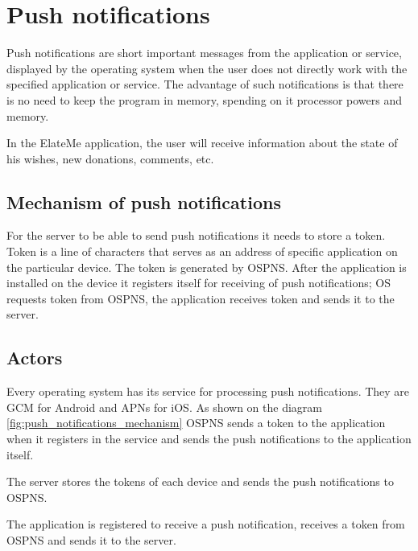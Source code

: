 \section{Push notifications}
Push notifications are short important messages from the application or service, displayed by the operating system when the user does not directly work with the specified application or service. The advantage of such notifications is that there is no need to keep the program in memory, spending on it processor powers and memory.

In the ElateMe application, the user will receive information about the state of his wishes, new donations, comments, etc.

\subsection{Mechanism of push notifications}


For the server to be able to send push notifications it needs to store a token. Token is a line of characters that serves as an address of specific application on the particular device. The token is generated by \ac{OSPNS}. After the application is installed on the device it registers itself for receiving of push notifications; OS requests token from \ac{OSPNS}, the application receives token and sends it to the server.

\subsection{Actors}

\begin{itemize}
Every operating system has its service for processing push notifications. They are \ac{GCM} for Android and \ac{APNs} for iOS. As shown on the diagram \ref{fig:push_notifications_mechanism} OSPNS sends a token to the application when it registers in the service and sends the push notifications to the application itself.

The server stores the tokens of each device and sends the push notifications to OSPNS.

The application is registered to receive a push notification, receives a token from OSPNS and sends it to the server.
\end{itemize}






